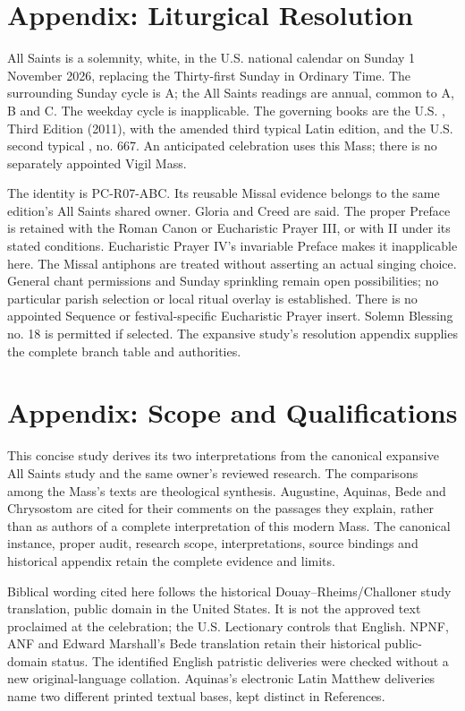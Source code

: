 \newpage
\section{Appendix: Liturgical Resolution}
All Saints is a solemnity, white, in the U.S. national calendar on Sunday 1 November 2026, replacing the Thirty-first Sunday in Ordinary Time. The surrounding Sunday cycle is A; the All Saints readings are annual, common to A, B and C. The weekday cycle is inapplicable. The governing books are the U.S. , Third Edition (2011), with the amended third typical Latin edition, and the U.S. second typical , no. 667. An anticipated celebration uses this Mass; there is no separately appointed Vigil Mass.

The identity is PC-R07-ABC. Its reusable Missal evidence belongs to the same edition's All Saints shared owner. Gloria and Creed are said. The proper Preface is retained with the Roman Canon or Eucharistic Prayer III, or with II under its stated conditions. Eucharistic Prayer IV's invariable Preface makes it inapplicable here. The Missal antiphons are treated without asserting an actual singing choice. General chant permissions and Sunday sprinkling remain open possibilities; no particular parish selection or local ritual overlay is established. There is no appointed Sequence or festival-specific Eucharistic Prayer insert. Solemn Blessing no. 18 is permitted if selected. The expansive study's resolution appendix supplies the complete branch table and authorities.

\section{Appendix: Scope and Qualifications}
This concise study derives its two interpretations from the canonical expansive All Saints study and the same owner's reviewed research. The comparisons among the Mass's texts are theological synthesis. Augustine, Aquinas, Bede and Chrysostom are cited for their comments on the passages they explain, rather than as authors of a complete interpretation of this modern Mass. The canonical instance, proper audit, research scope, interpretations, source bindings and historical appendix retain the complete evidence and limits.

Biblical wording cited here follows the historical Douay--Rheims/Challoner study translation, public domain in the United States. It is not the approved text proclaimed at the celebration; the U.S. Lectionary controls that English. NPNF, ANF and Edward Marshall's Bede translation retain their historical public-domain status. The identified English patristic deliveries were checked without a new original-language collation. Aquinas's electronic Latin Matthew deliveries name two different printed textual bases, kept distinct in References.

